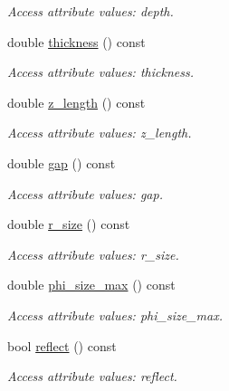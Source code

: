 \begin{DoxyCompactItemize}
\begin{DoxyCompactList}\small\item\em Access attribute values: depth. \item\end{DoxyCompactList}\item 
double \hyperlink{struct_d_d4hep_1_1_x_m_l_1_1_child_value_a3647a99e18716de163f51135aad2c070}{thickness} () const 
\begin{DoxyCompactList}\small\item\em Access attribute values: thickness. \item\end{DoxyCompactList}\item 
double \hyperlink{struct_d_d4hep_1_1_x_m_l_1_1_child_value_a52c87e64bf5684d97244f9eb7857308f}{z\_\-length} () const 
\begin{DoxyCompactList}\small\item\em Access attribute values: z\_\-length. \item\end{DoxyCompactList}\item 
double \hyperlink{struct_d_d4hep_1_1_x_m_l_1_1_child_value_a6d4360815f5a9d7cf21ce0c4df0bc7e6}{gap} () const 
\begin{DoxyCompactList}\small\item\em Access attribute values: gap. \item\end{DoxyCompactList}\item 
double \hyperlink{struct_d_d4hep_1_1_x_m_l_1_1_child_value_a37ebca44cc92eb011023abdeab5cc72b}{r\_\-size} () const 
\begin{DoxyCompactList}\small\item\em Access attribute values: r\_\-size. \item\end{DoxyCompactList}\item 
double \hyperlink{struct_d_d4hep_1_1_x_m_l_1_1_child_value_a2fdfd2557aa5680af6d8dae632a17e47}{phi\_\-size\_\-max} () const 
\begin{DoxyCompactList}\small\item\em Access attribute values: phi\_\-size\_\-max. \item\end{DoxyCompactList}\item 
bool \hyperlink{struct_d_d4hep_1_1_x_m_l_1_1_child_value_aa4a712bb68faffbd0ff7d4b6cae79d57}{reflect} () const 
\begin{DoxyCompactList}\small\item\em Access attribute values: reflect. \item\end{DoxyCompactList}\item 

\end{DoxyCompactItemize}
